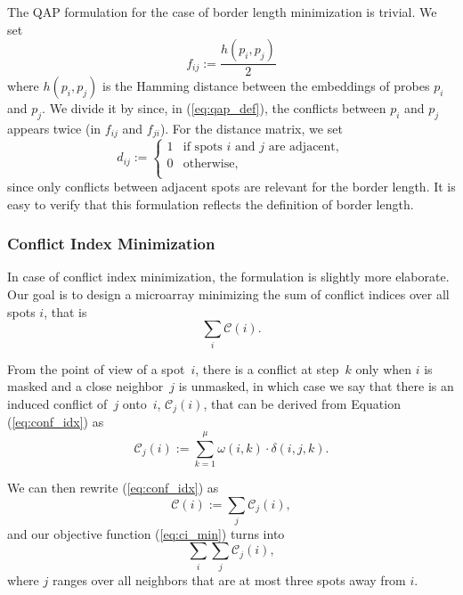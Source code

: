 \documentclass{bioinfo}
\begin{document}
The QAP formulation for the case of border length minimization is trivial. We set
\begin{equation}
f_{ij} := \frac{h(p_i, p_j)}{2}
\end{equation}
where $h(p_i, p_j)$ is the Hamming distance between the embeddings of probes $p_i$ and $p_j$. We divide it by since, in (\ref{eq:qap_def}), the conflicts between $p_i$ and $p_j$ appears twice (in $f_{ij}$ and $f_{ji}$). For the distance matrix, we set
\begin{equation}
d_{ij} :=
        \left\{
                \begin{array}{ll}
                        1 & \mbox{if spots $i$ and $j$ are adjacent}, \\
                        0 & \mbox{otherwise}, \\
                \end{array}
        \right.
\end{equation}
since only conflicts between adjacent spots are relevant for the border length. It is easy to verify that this formulation reflects the definition of border length.

\subsubsection{Conflict Index Minimization}

In case of conflict index minimization, the formulation is slightly more elaborate. Our goal is to design a microarray minimizing the sum of conflict indices over all spots $i$, that is
\begin{equation}
\label{eq:ci_min}
\sum_{i} \mathcal{C}(i).
\end{equation}

From the point of view of a spot~$i$, there is a conflict at step~$k$ only when $i$ is masked and a close neighbor~$j$ is unmasked, in which case we say that there is an induced conflict of~$j$ onto~$i$, $\mathcal{C}_{j}(i)$, that can be derived from Equation (\ref{eq:conf_idx}) as
\begin{equation}
\label{eq:induced_conf_idx}
\mathcal{C}_{j}(i) := \sum_{k=1}^{\mu} \omega(i,k) \cdot \delta(i,j,k).
\end{equation}

We can then rewrite (\ref{eq:conf_idx}) as
\begin{equation}
\mathcal{C}(i) := \sum_{j} \mathcal{C}_{j}(i),
\end{equation}
and our objective function (\ref{eq:ci_min}) turns into
\begin{equation}
\label{eq:ci_min_qap}
\sum_{i} \sum_{j} \mathcal{C}_{j}(i),
\end{equation}
where $j$ ranges over all neighbors that are at most three spots away from $i$.
\end{document}
